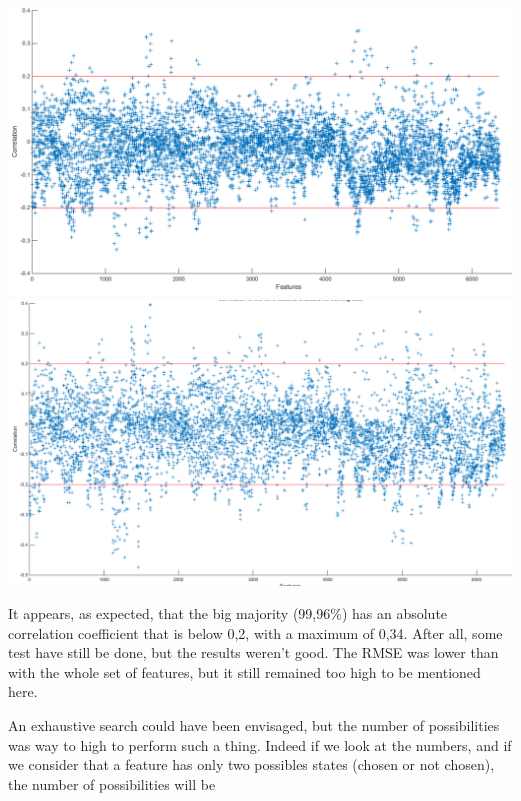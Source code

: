 \documentclass{report}
\begin{document}
	\vspace{0.5cm}
	\begin{center}
		\includegraphics[scale=0.35]{ressources/corr1}
		\vspace{1cm}
		\includegraphics[scale=0.28]{ressources/corr2}
	\end{center}
	
	
	It appears, as expected, that the big majority (99,96\%) has an absolute correlation coefficient that is below 0,2, with a maximum of 0,34. After all, some test have still be done, but the results weren't good. The RMSE was lower than with the whole set of features, but it still remained too high to be mentioned here.
	
	An exhaustive search could have been envisaged, but the number of possibilities was way to high to perform such a thing. Indeed if we look at the numbers, and if we consider that a feature has only two possibles states (chosen or not chosen), the number of possibilities will be
	
\end{document}
